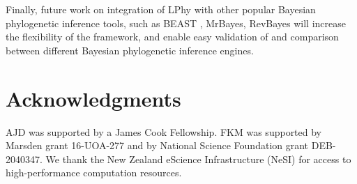 \documentclass[10pt,letterpaper,table]{article}
\theoremstyle{definition}
\begin{document}
Finally, future work on integration of LPhy with other popular Bayesian phylogenetic inference tools, such as BEAST \cite{suchard2018bayesian}, MrBayes\cite{ronquist2012mrbayes}, RevBayes\cite{hohna2016revbayes} will increase the flexibility of the framework, and enable easy validation of and comparison between different Bayesian phylogenetic inference engines.

\section*{Acknowledgments}
AJD was supported by a James Cook Fellowship. FKM was supported by Marsden grant 16-UOA-277 and by National Science Foundation grant DEB-2040347. We thank the New Zealand eScience Infrastructure (NeSI) for access to high-performance computation resources.

\nolinenumbers

%
%
% 

\end{document}

